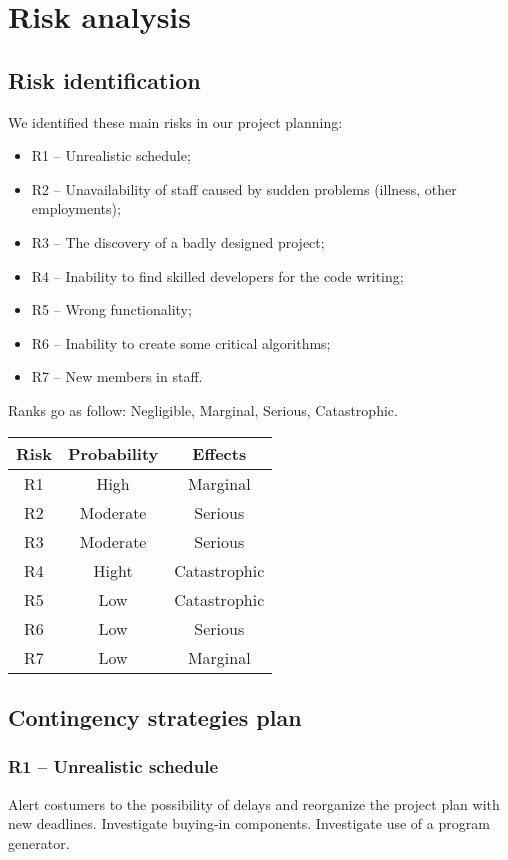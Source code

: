\chapter{Risk analysis}

\section{Risk identification}
We identified these main risks in our project planning:
\begin{itemize}
\item R1 -- Unrealistic schedule;
\item R2 -- Unavailability of staff caused by sudden problems (illness, other employments);
\item R3 -- The discovery of a badly designed project;
\item R4 -- Inability to find skilled developers for the code writing;
\item R5 -- Wrong functionality;
\item R6 -- Inability to create some critical algorithms;
\item R7 -- New members in staff.
\end{itemize}

Ranks go as follow: Negligible, Marginal, Serious, Catastrophic.

\begin{center}
\begin{tabular}{ccc}
\toprule
Risk	&	Probability	&	Effects	\\
\midrule
R1	&	High		&	Marginal	\\
R2	&	Moderate	&	Serious	\\
R3	&	Moderate	&	Serious	\\
R4	&	Hight		&	Catastrophic	\\
R5	&	Low		&	Catastrophic	\\
R6	&	Low		&	Serious	\\
R7	&	Low		&	Marginal	\\
\bottomrule
\end{tabular}
\end{center}

\section{Contingency strategies plan}
\subsection{R1 -- Unrealistic schedule}
Alert costumers to the possibility of delays and reorganize the project plan with new deadlines. Investigate buying-in components. Investigate use of a program generator. 

